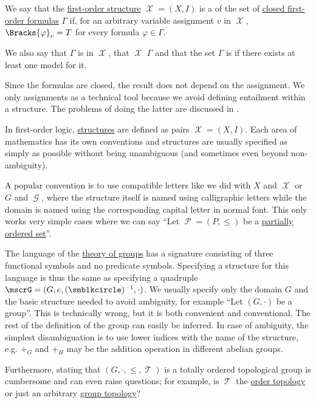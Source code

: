 \begin{definition}\label{def:first_order_model}
  We say that the \hyperref[def:first_order_structure]{first-order structure} \( \mscrX = (X, I) \) is a  of the set of \hyperref[def:first_order_syntax/closed_formula]{closed first-order formulas} \( \Gamma \) if, for an arbitrary variable assignment \( v \) in \( \mscrX \), \( \Bracks{\varphi}_v = T \) for every formula \( \varphi \in \Gamma \).

  We also say that \( \Gamma \) is  in \( \mscrX \), that \( \mscrX \)  \( \Gamma \) and that the set \( \Gamma \) is  if there exists at least one model for it.
\end{definition}
\begin{comments}
  \item Since the formulas are closed, the result does not depend on the assignment. We only assignments as a technical tool because we avoid defining entailment within a structure. The problems of doing the latter are discussed in .
\end{comments}

\begin{remark}\label{rem:first_order_model_notation}
  In first-order logic, \hyperref[def:first_order_structure]{structures} are defined as pairs \( \mscrX = (X, I) \). Each area of mathematics has its own conventions and structures are usually specified as simply as possible without being unambiguous (and sometimes even beyond non-ambiguity).

  A popular convention is to use compatible letters like we did with \( X \) and \( \mscrX \) or \( G \) and \( \mscrG \), where the structure itself is named using calligraphic letters while the domain is named using the corresponding capital letter in normal font. This only works very simple cases where we can say \enquote{Let \( \mscrP = (P, \leq) \) be a \hyperref[def:partially_ordered_set]{partially ordered set}}.

  The language of the \hyperref[def:group/theory]{theory of groups} has a signature consisting of three functional symbols and no predicate symbols. Specifying a structure for this language is thus the same as specifying a quadruple \( \mscrG = (G, e, (\anon)^{-1}, \cdot) \). We usually specify only the domain \( G \) and the basic structure needed to avoid ambiguity, for example \enquote{Let \( (G, \cdot) \) be a group}. This is technically wrong, but it is both convenient and conventional. The rest of the definition of the group can easily be inferred. In case of ambiguity, the simplest disambiguation is to use lower indices with the name of the structure, e.g. \( +_G \) and \( +_H \) may be the addition operation in different abelian groups.

  Furthermore, stating that \( (G, \cdot, \leq, \mscrT) \) is a totally ordered topological group is cumbersome and can even raise questions; for example, is \( \mscrT \) the \hyperref[def:order_topology]{order topology} or just an arbitrary \hyperref[rem:topological_first_order_structures]{group topology}?
\end{remark}

